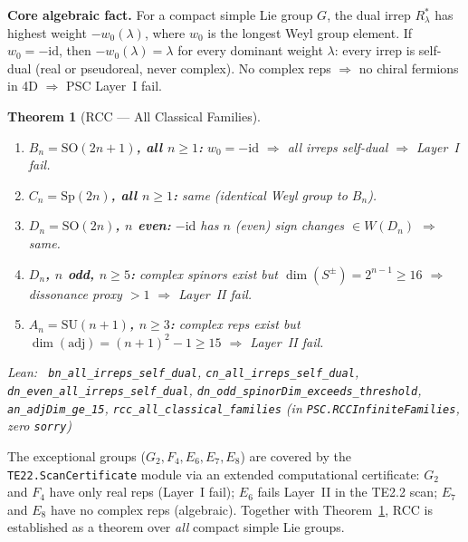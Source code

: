 \documentclass[11pt,a4paper]{article}
\newenvironment{leanref}%
  {\par\smallskip\noindent\begingroup\raggedright\textup{Lean:}~}%
  {\par\endgroup}
\newtheorem{theorem}{Theorem}[section]
\theoremstyle{definition}
\begin{document}
\textbf{Core algebraic fact.}
For a compact simple Lie group $G$, the dual irrep $R_\lambda^*$ has highest weight
$-w_0(\lambda)$, where $w_0$ is the longest Weyl group element.
If $w_0 = -\mathrm{id}$, then $-w_0(\lambda) = \lambda$ for every dominant weight
$\lambda$: every irrep is self-dual (real or pseudoreal, never complex).
No complex reps $\Rightarrow$ no chiral fermions in 4D $\Rightarrow$ PSC Layer~I fail.

\begin{theorem}[RCC --- All Classical Families]\label{thm:rcc_infinite}
\begin{enumerate}[leftmargin=1.5em,itemsep=2pt]
  \item \textbf{$B_n = \mathrm{SO}(2n+1)$, all $n \ge 1$:}
    $w_0 = -\mathrm{id}$ $\Rightarrow$ all irreps self-dual $\Rightarrow$ Layer~I fail.
  \item \textbf{$C_n = \mathrm{Sp}(2n)$, all $n \ge 1$:}
    same (identical Weyl group to $B_n$).
  \item \textbf{$D_n = \mathrm{SO}(2n)$, $n$ even:}
    $-\mathrm{id}$ has $n$ (even) sign changes $\in W(D_n)$ $\Rightarrow$ same.
  \item \textbf{$D_n$, $n$ odd, $n \ge 5$:}
    complex spinors exist but $\dim(S^\pm) = 2^{n-1} \ge 16$
    $\Rightarrow$ dissonance proxy $> 1$ $\Rightarrow$ Layer~II fail.
  \item \textbf{$A_n = \mathrm{SU}(n+1)$, $n \ge 3$:}
    complex reps exist but $\dim(\mathrm{adj}) = (n+1)^2{-}1 \ge 15$
    $\Rightarrow$ Layer~II fail.
\end{enumerate}
\begin{leanref}
\lstinline|bn_all_irreps_self_dual|,
\lstinline|cn_all_irreps_self_dual|,
\lstinline|dn_even_all_irreps_self_dual|,
\lstinline|dn_odd_spinorDim_exceeds_threshold|,
\lstinline|an_adjDim_ge_15|,
\lstinline|rcc_all_classical_families|
\textup{(in \texttt{PSC.RCCInfiniteFamilies}, zero \texttt{sorry})}
\end{leanref}
\end{theorem}

The exceptional groups ($G_2, F_4, E_6, E_7, E_8$) are covered by the
\texttt{TE22.ScanCertificate} module via an extended computational certificate:
$G_2$ and $F_4$ have only real reps (Layer~I fail); $E_6$ fails Layer~II
in the TE2.2 scan; $E_7$ and $E_8$ have no complex reps (algebraic).
Together with Theorem~\ref{thm:rcc_infinite}, RCC is established as a theorem
over \emph{all} compact simple Lie groups.

\end{document}

